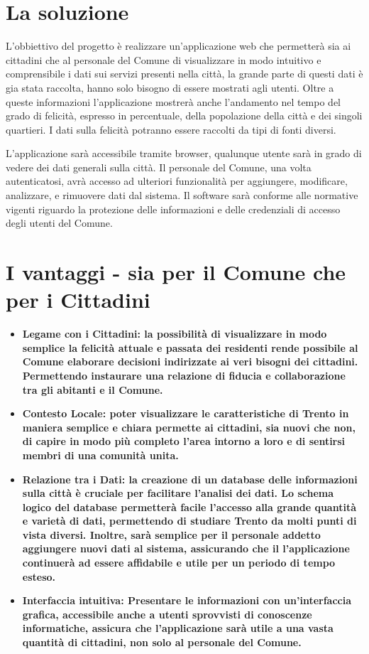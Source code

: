 \section{La soluzione}
    L'obbiettivo del progetto è realizzare un'applicazione web che permetterà sia ai cittadini che al personale del Comune di visualizzare in modo intuitivo e comprensibile i dati sui servizi presenti nella città, la grande parte di questi dati è gia stata raccolta, hanno solo bisogno di essere mostrati agli utenti. Oltre a queste informazioni l'applicazione mostrerà anche l'andamento nel tempo del grado di felicità, espresso in percentuale, della popolazione della città e dei singoli quartieri. I dati sulla felicità potranno essere raccolti da tipi di fonti diversi.

    L'applicazione sarà accessibile tramite browser, qualunque utente sarà in grado di vedere dei dati generali sulla città. Il personale del Comune, una volta autenticatosi, avrà accesso ad ulteriori funzionalità per aggiungere, modificare, analizzare, e rimuovere dati dal sistema. Il software sarà conforme alle normative vigenti riguardo la protezione delle informazioni e delle credenziali di accesso degli utenti del Comune.


\section{I vantaggi - sia per il Comune che per i Cittadini}
    \begin{itemize}
        \item \textbf{Legame con i Cittadini: la possibilità di visualizzare in modo semplice la felicità attuale e passata dei residenti rende possibile al Comune elaborare decisioni indirizzate ai veri bisogni dei cittadini. Permettendo instaurare una relazione di fiducia e collaborazione tra gli abitanti e il Comune.}
        \item \textbf{Contesto Locale: poter visualizzare le caratteristiche di Trento in maniera semplice e chiara permette ai cittadini, sia nuovi che non, di capire in modo più completo l'area intorno a loro e di sentirsi membri di una comunità unita.}
        \item \textbf{Relazione tra i Dati: la creazione di un database delle informazioni sulla città è cruciale per facilitare l'analisi dei dati. Lo schema logico del database permetterà facile l'accesso alla grande quantità e varietà di dati, permettendo di studiare Trento da molti punti di vista diversi. Inoltre, sarà semplice per il personale addetto aggiungere nuovi dati al sistema, assicurando che il l'applicazione continuerà ad essere affidabile e utile per un periodo di tempo esteso.}
        \item \textbf{Interfaccia intuitiva: Presentare le informazioni con un'interfaccia grafica, accessibile anche a utenti sprovvisti di conoscenze informatiche, assicura che l'applicazione sarà utile a una vasta quantità di cittadini, non solo al personale del Comune.}
    \end{itemize}